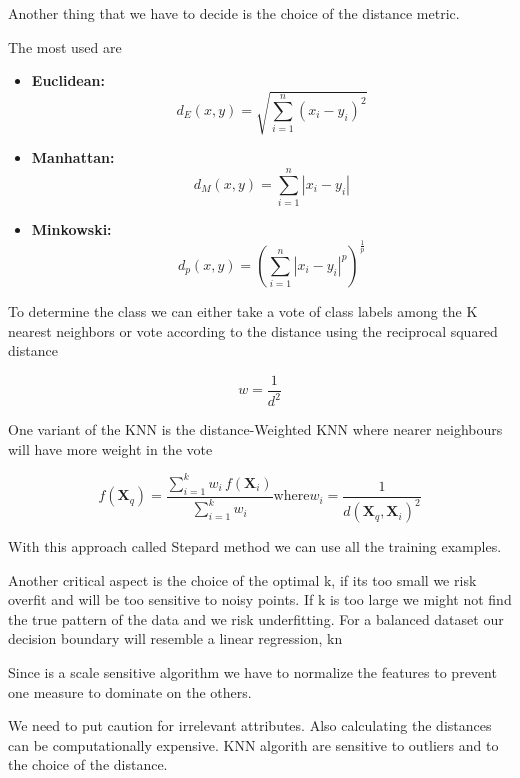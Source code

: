 Another thing that we have to decide is the choice of the distance metric.

The most used are

\begin{itemize}
    \item \textbf{Euclidean:}
    \[
        d_E(x, y) = \sqrt{\sum_{i=1}^{n} (x_i - y_i)^2}
    \]

    \item \textbf{Manhattan:}
    \[
        d_M(x, y) = \sum_{i=1}^{n} |x_i - y_i|
    \]

    \item \textbf{Minkowski:}
    \[
        d_p(x, y) = \left( \sum_{i=1}^{n} |x_i - y_i|^p \right)^{\frac{1}{p}}
    \]
\end{itemize}

To determine the class we can either take a vote of class labels among the K nearest neighbors or vote according to the distance using the 
reciprocal squared distance

\[
w = \frac{1}{d^2}
\]

\vspace{10pt}

One variant of the KNN is the distance-Weighted KNN where nearer neighbours will have more weight in the vote

\begin{equation*}
    f(\mathbf{X}_q) = \frac{\displaystyle\sum_{i=1}^{k} w_i\, f(\mathbf{X}_i)}{\displaystyle\sum_{i=1}^{k} w_i} \text{where} w_i = \frac{1}{d(\textbf{X}_q, \textbf{X}_i)^2}
\end{equation*}

With this approach called Stepard method we can use all the training examples.

\vspace{10pt}

Another critical aspect is the choice of the optimal k, if its too small we risk overfit and will be too sensitive to noisy points. If k is too large we might not find the true pattern of the data and we risk underfitting.
For a balanced dataset our decision boundary will resemble a linear regression, k\ra n

\vspace{10pt}

Since is a scale sensitive algorithm we have to normalize the features to prevent one measure to dominate on the others.

We need to put caution for irrelevant attributes. Also calculating the distances can be computationally expensive. KNN algorith are sensitive to outliers and to the choice of the distance.

